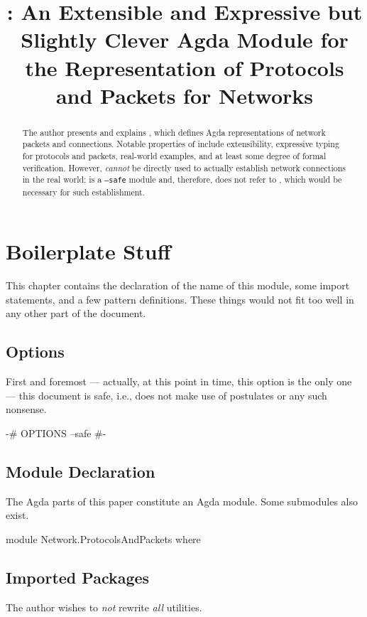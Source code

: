 \documentclass{report}
\title{\AgdaModule{Network.ProtocolsAndPackets}: An Extensible and Expressive but Slightly Clever Agda Module for the Representation of Protocols and Packets for Networks}
\begin{document}
\maketitle{}

\begin{abstract}
The author presents and explains , which defines Agda representations of network packets and connections.  Notable properties of  include extensibility, expressive typing for protocols and packets, real-world examples, and at least some degree of formal verification.  However,  \emph{cannot} be directly used to actually establish network connections in the real world;  is a \texttt{--safe} module and, therefore, does not refer to , which would be necessary for such establishment.
\end{abstract}

\chapter{Boilerplate Stuff}
This chapter contains the declaration of the name of this module, some import statements, and a few pattern definitions.  These things would not fit too well in any other part of the document.

\section{Options}
First and foremost --- actually, at this point in time, this option is the only one --- this document is safe, i.e., does not make use of postulates or any such nonsense.

\begin{code}
{-# OPTIONS --safe #-}
\end{code}

\section{Module Declaration}
The Agda parts of this paper constitute an Agda module.  Some submodules also exist.

\begin{code}
module Network.ProtocolsAndPackets where
\end{code}

\section{Imported Packages}
The author wishes to \emph{not} rewrite \emph{all} utilities.
\end{document}
